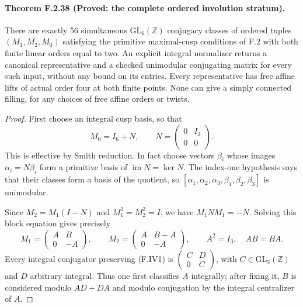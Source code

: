 \paragraph{Theorem F.2.38 (Proved: the complete ordered involution stratum).}
There are exactly 56 simultaneous $\mathrm{GL}_6(\mathbb Z)$
conjugacy classes of ordered tuples $(M_1,M_2,M_0)$ satisfying
the primitive maximal-cusp conditions of F.2 with both finite
linear orders equal to two.  An explicit integral normalizer
returns a canonical representative and a checked unimodular
conjugating matrix for every such input, without any bound on
its entries.  Every representative has free affine lifts of
actual order four at both finite points.  None can give a
simply connected filling, for any choices of free affine
orders or twists.

\begin{proof}
First choose an integral cusp basis, so that
\[
 M_0=I_6+N,\qquad N=\begin{pmatrix}0&I_3\\0&0\end{pmatrix}.
                                                               \tag{F.IV1}
\]
This is effective by Smith reduction.  In fact choose vectors
$\beta_i$ whose images $\alpha_i=N\beta_i$ form a primitive
basis of $\operatorname{im}N=\ker N$.
The index-one hypothesis says that their classes form a basis
of the quotient, so $[\alpha_1,\alpha_2,\alpha_3,
\beta_1,\beta_2,\beta_3]$ is unimodular.

Since $M_2=M_1(I-N)$ and $M_1^2=M_2^2=I$, we have
$M_1NM_1=-N$.  Solving this block equation gives precisely
\[
 M_1=\begin{pmatrix}A&B\\0&-A\end{pmatrix},\qquad
 M_2=\begin{pmatrix}A&B-A\\0&-A\end{pmatrix},\qquad
 A^2=I_3,\quad AB=BA.                                     \tag{F.IV2}
\]
Every integral conjugator preserving (F.IV1) is
$\begin{pmatrix}C&D\\0&C\end{pmatrix}$, with
$C\in\mathrm{GL}_3(\mathbb Z)$ and $D$ arbitrary integral.
Thus one first classifies $A$ integrally; after fixing it,
$B$ is considered modulo $AD+DA$ and modulo conjugation by
the integral centralizer of $A$.


\end{proof}
